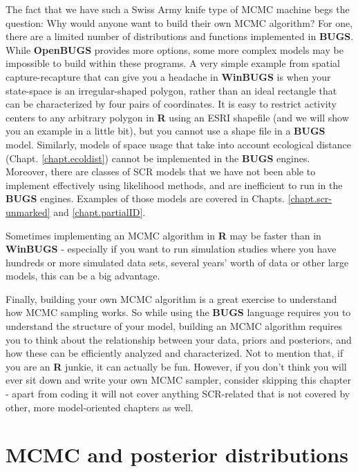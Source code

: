 The fact that we have such a Swiss Army knife type of MCMC machine
begs the question: Why would anyone want to build their own MCMC
algorithm? For one, there are a limited number of distributions and
functions implemented in {\bf BUGS}. While {\bf OpenBUGS} provides more
options, some more complex models may be impossible to build within
these programs. A very simple example from spatial capture-recapture
that can give you a headache in {\bf WinBUGS} is when your state-space is an
irregular-shaped polygon, rather than an ideal rectangle that can be
characterized by four pairs of coordinates. It is easy to restrict
activity centers to any arbitrary polygon in {\bf R} using an ESRI shapefile
(and we will show you an example in a little bit), but you cannot use
a shape file in a {\bf BUGS} model.  Similarly, models of space usage
that take into account ecological distance
(Chapt. \ref{chapt.ecoldist}) cannot be implemented in the {\bf BUGS}
engines.  Moreover, there are classes of
SCR models that we have not been able to implement effectively using
likelihood methods, and are inefficient to run in the {\bf BUGS}
engines. Examples of those models are covered in Chapts.
\ref{chapt.scr-unmarked} and \ref{chapt.partialID}.

Sometimes implementing an MCMC algorithm in {\bf R} may be faster than in
{\bf WinBUGS} - especially if you want to run simulation studies where you
have hundreds or more simulated data sets, several years' worth of
data or other large models, this can be a big advantage.

Finally, building your own MCMC algorithm is a great exercise to
understand how MCMC sampling works. So while using the {\bf BUGS}
language requires you to understand the structure of your model,
building an MCMC algorithm requires you to think about the
relationship between your data, priors and posteriors, and how these
can be efficiently analyzed and characterized. Not to mention that, if
you are an {\bf R} junkie, it can actually be fun.  However, if you
don't think you will ever sit down and write your own MCMC sampler,
consider skipping this chapter - apart from coding it will not cover
anything SCR-related that is not covered by other, more model-oriented
chapters as well.


\section{MCMC and posterior distributions}

